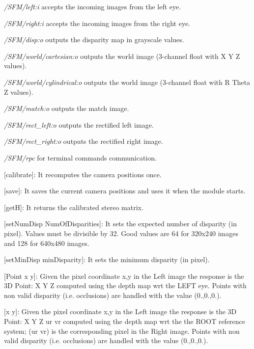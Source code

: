 \begin{DoxyItemize}
\item {\itshape  /\+S\+F\+M/left\+:i } accepts the incoming images from the left eye.
\item {\itshape  /\+S\+F\+M/right\+:i } accepts the incoming images from the right eye.
\item {\itshape  /\+S\+F\+M/disp\+:o } outputs the disparity map in grayscale values.
\item {\itshape  /\+S\+F\+M/world/cartesian\+:o} outputs the world image (3-\/channel float with X Y Z values).
\item {\itshape  /\+S\+F\+M/world/cylindrical\+:o} outputs the world image (3-\/channel float with R Theta Z values).
\item {\itshape  /\+S\+F\+M/match\+:o} outputs the match image.
\item {\itshape  /\+S\+F\+M/rect\+\_\+left\+:o} outputs the rectified left image.
\item {\itshape  /\+S\+F\+M/rect\+\_\+right\+:o} outputs the rectified right image.
\item {\itshape  /\+S\+F\+M/rpc } for terminal commands communication.
\begin{DoxyItemize}
\item \mbox{[}calibrate\mbox{]}\+: It recomputes the camera positions once.
\item \mbox{[}save\mbox{]}\+: It saves the current camera positions and uses it when the module starts.
\item \mbox{[}getH\mbox{]}\+: It returns the calibrated stereo matrix.
\item \mbox{[}set\+Num\+Disp Num\+Of\+Disparities\mbox{]}\+: It sets the expected number of disparity (in pixel). Values must be divisible by 32. Good values are 64 for 320x240 images and 128 for 640x480 images.
\item \mbox{[}set\+Min\+Disp min\+Disparity\mbox{]}\+: It sets the minimum disparity (in pixel).
\item \mbox{[}Point x y\mbox{]}\+: Given the pixel coordinate x,y in the Left image the response is the 3D Point\+: X Y Z computed using the depth map wrt the L\+E\+FT eye. Points with non valid disparity (i.\+e. occlusions) are handled with the value (0.,0.,0.).
\item \mbox{[}x y\mbox{]}\+: Given the pixel coordinate x,y in the Left image the response is the 3D Point\+: X Y Z ur vr computed using the depth map wrt the the R\+O\+OT reference system; (ur vr) is the corresponding pixel in the Right image. Points with non valid disparity (i.\+e. occlusions) are handled with the value (0.,0.,0.).

\end{DoxyItemize}
\end{DoxyItemize}
